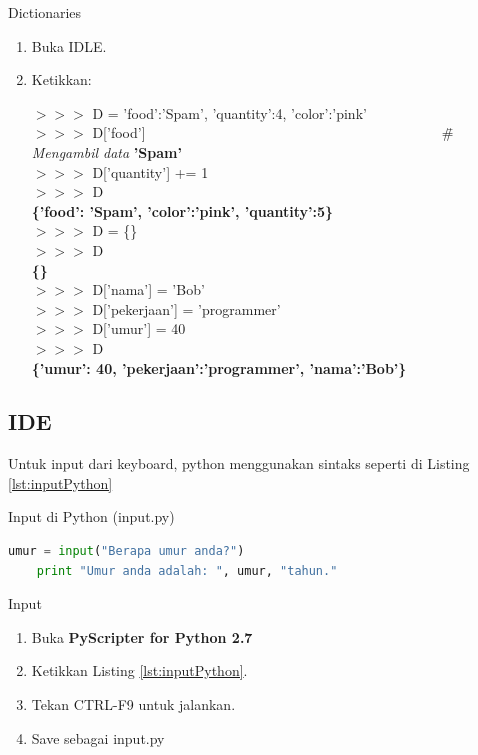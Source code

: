 \begin{panduan}{Dictionaries}
\begin{enumerate}
	\item Buka IDLE.
	\item Ketikkan:
		\begin{IDLE}
		\begin{tabbing}
		$>>>$ D = {'food':'Spam', 'quantity':4, 'color':'pink'} \\
		$>>>$ D['food'] ~~~~~~~~~~~~~~~~~~~~~~~~~~~~~~~~~~~~~~~~~ \=  \# \textit{Mengambil data}
		\textbf{'Spam'} \\
		$>>>$ D['quantity'] += 1 \\
		$>>>$ D \\ 
		\textbf{\{'food': 'Spam', 'color':'pink', 'quantity':5\}} \\
		$>>>$ D = \{\} \\
		$>>>$ D \\
		\textbf{\{\}}\\
		$>>>$ D['nama'] = 'Bob' \\
		$>>>$ D['pekerjaan'] = 'programmer' \\
		$>>>$ D['umur'] = 40 \\
		$>>>$ D \\
		\textbf{\{'umur': 40, 'pekerjaan':'programmer', 'nama':'Bob'\}}
		\end{tabbing}
		\end{IDLE}	
\end{enumerate}
\end{panduan}

\subsection{IDE}

Untuk input dari keyboard, python menggunakan sintaks seperti di Listing \ref{lst:inputPython}
\begin{listprog}{Input di Python (input.py)}
	\label{lst:inputPython}
	\begin{lstlisting}[language=Python]
	umur = input("Berapa umur anda?")
	print "Umur anda adalah: ", umur, "tahun."
	\end{lstlisting}
\end{listprog}
\begin{panduan}{Input}
\begin{enumerate}
	\item Buka \textbf{PyScripter for Python 2.7}
	\item Ketikkan Listing \ref{lst:inputPython}.
	\item Tekan CTRL-F9 untuk jalankan.
	\item Save sebagai input.py
\end{enumerate}
\end{panduan}

